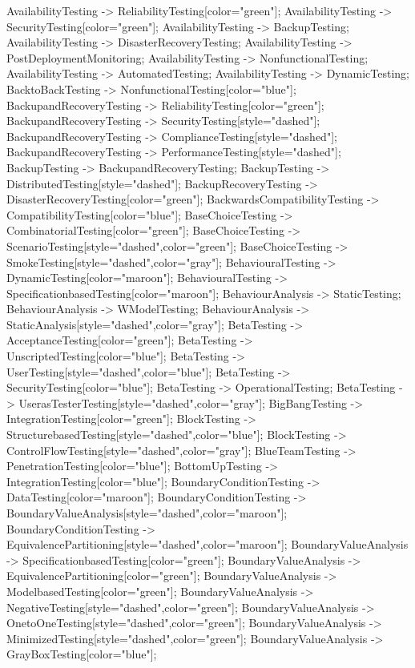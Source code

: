 \documentclass{article}
\begin{document}
{AvailabilityTesting -> ReliabilityTesting[color="green"];
AvailabilityTesting -> SecurityTesting[color="green"];
AvailabilityTesting -> BackupTesting;
AvailabilityTesting -> DisasterRecoveryTesting;
AvailabilityTesting -> PostDeploymentMonitoring;
AvailabilityTesting -> NonfunctionalTesting;
AvailabilityTesting -> AutomatedTesting;
AvailabilityTesting -> DynamicTesting;
BacktoBackTesting -> NonfunctionalTesting[color="blue"];
BackupandRecoveryTesting -> ReliabilityTesting[color="green"];
BackupandRecoveryTesting -> SecurityTesting[style="dashed"];
BackupandRecoveryTesting -> ComplianceTesting[style="dashed"];
BackupandRecoveryTesting -> PerformanceTesting[style="dashed"];
BackupTesting -> BackupandRecoveryTesting;
BackupTesting -> DistributedTesting[style="dashed"];
BackupRecoveryTesting -> DisasterRecoveryTesting[color="green"];
BackwardsCompatibilityTesting -> CompatibilityTesting[color="blue"];
BaseChoiceTesting -> CombinatorialTesting[color="green"];
BaseChoiceTesting -> ScenarioTesting[style="dashed",color="green"];
BaseChoiceTesting -> SmokeTesting[style="dashed",color="gray"];
BehaviouralTesting -> DynamicTesting[color="maroon"];
BehaviouralTesting -> SpecificationbasedTesting[color="maroon"];
BehaviourAnalysis -> StaticTesting;
BehaviourAnalysis -> WModelTesting;
BehaviourAnalysis -> StaticAnalysis[style="dashed",color="gray"];
BetaTesting -> AcceptanceTesting[color="green"];
BetaTesting -> UnscriptedTesting[color="blue"];
BetaTesting -> UserTesting[style="dashed",color="blue"];
BetaTesting -> SecurityTesting[color="blue"];
BetaTesting -> OperationalTesting;
BetaTesting -> UserasTesterTesting[style="dashed",color="gray"];
BigBangTesting -> IntegrationTesting[color="green"];
BlockTesting -> StructurebasedTesting[style="dashed",color="blue"];
BlockTesting -> ControlFlowTesting[style="dashed",color="gray"];
BlueTeamTesting -> PenetrationTesting[color="blue"];
BottomUpTesting -> IntegrationTesting[color="blue"];
BoundaryConditionTesting -> DataTesting[color="maroon"];
BoundaryConditionTesting -> BoundaryValueAnalysis[style="dashed",color="maroon"];
BoundaryConditionTesting -> EquivalencePartitioning[style="dashed",color="maroon"];
BoundaryValueAnalysis -> SpecificationbasedTesting[color="green"];
BoundaryValueAnalysis -> EquivalencePartitioning[color="green"];
BoundaryValueAnalysis -> ModelbasedTesting[color="green"];
BoundaryValueAnalysis -> NegativeTesting[style="dashed",color="green"];
BoundaryValueAnalysis -> OnetoOneTesting[style="dashed",color="green"];
BoundaryValueAnalysis -> MinimizedTesting[style="dashed",color="green"];
BoundaryValueAnalysis -> GrayBoxTesting[color="blue"];
}
\end{document}
